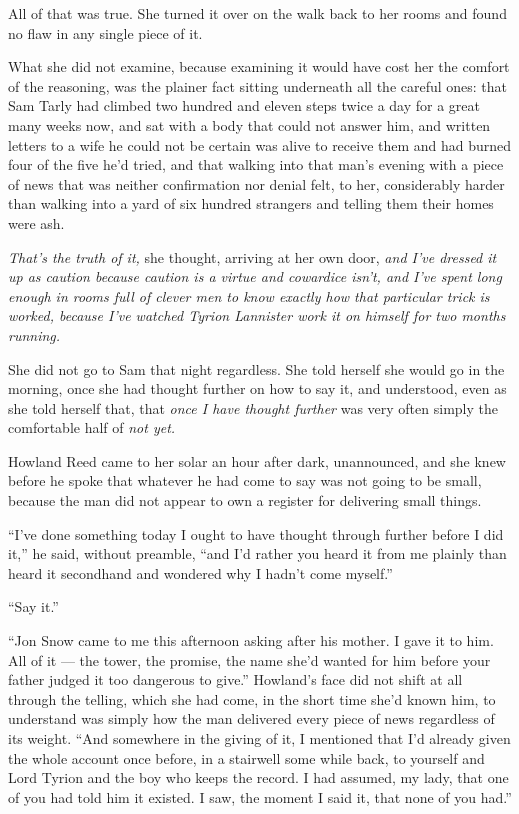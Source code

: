 All of that was true. She turned it over on the walk back to her rooms and found no flaw in any single piece of it.

What she did not examine, because examining it would have cost her the comfort of the reasoning, was the plainer fact sitting underneath all the careful ones: that Sam Tarly had climbed two hundred and eleven steps twice a day for a great many weeks now, and sat with a body that could not answer him, and written letters to a wife he could not be certain was alive to receive them and had burned four of the five he’d tried, and that walking into that man’s evening with a piece of news that was neither confirmation nor denial felt, to her, considerably harder than walking into a yard of six hundred strangers and telling them their homes were ash.

\textit{That’s the truth of it,} she thought, arriving at her own door, \textit{and I’ve dressed it up as caution because caution is a virtue and cowardice isn’t, and I’ve spent long enough in rooms full of clever men to know exactly how that particular trick is worked, because I’ve watched Tyrion Lannister work it on himself for two months running.}

She did not go to Sam that night regardless. She told herself she would go in the morning, once she had thought further on how to say it, and understood, even as she told herself that, that \textit{once I have thought further} was very often simply the comfortable half of \textit{not yet.}

\sceneBreak

Howland Reed came to her solar an hour after dark, unannounced, and she knew before he spoke that whatever he had come to say was not going to be small, because the man did not appear to own a register for delivering small things.

“I’ve done something today I ought to have thought through further before I did it,” he said, without preamble, “and I’d rather you heard it from me plainly than heard it secondhand and wondered why I hadn’t come myself.”

“Say it.”

“Jon Snow came to me this afternoon asking after his mother. I gave it to him. All of it — the tower, the promise, the name she’d wanted for him before your father judged it too dangerous to give.” Howland’s face did not shift at all through the telling, which she had come, in the short time she’d known him, to understand was simply how the man delivered every piece of news regardless of its weight. “And somewhere in the giving of it, I mentioned that I’d already given the whole account once before, in a stairwell some while back, to yourself and Lord Tyrion and the boy who keeps the record. I had assumed, my lady, that one of you had told him it existed. I saw, the moment I said it, that none of you had.”

